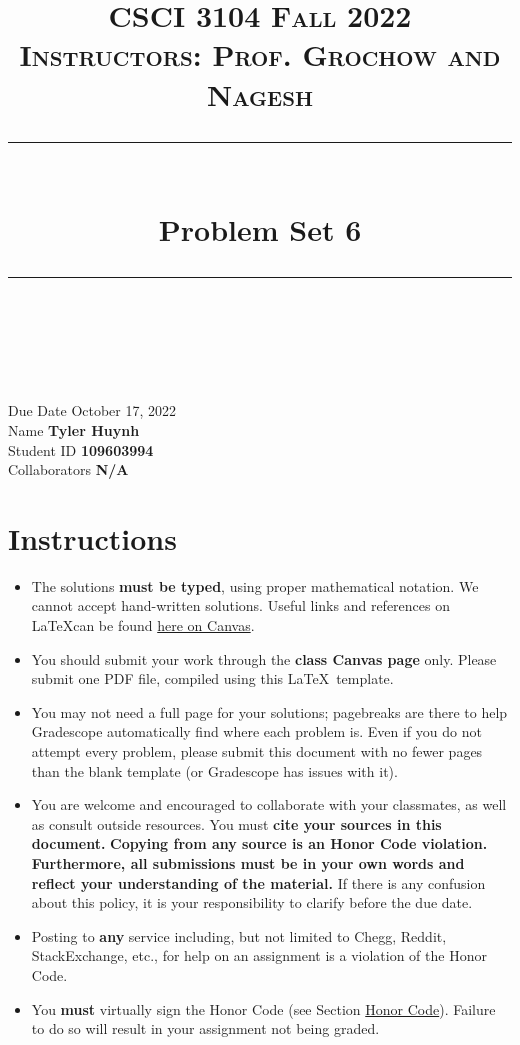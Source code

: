 \documentclass[11pt]{article}
\title{
\normalfont \normalsize 
\textsc{CSCI 3104 Fall 2022 \\ 
Instructors: Prof. Grochow and Nagesh} \\
[10pt] 
\rule{\linewidth}{0.5pt} \\[6pt] 
\huge Problem Set 6 \\
\rule{\linewidth}{2pt}  \\[10pt]
}
\date{}
\theoremstyle{definition}
\theoremstyle{definition}
\theoremstyle{definition}
\begin{document}

\maketitle


\noindent
Due Date \dotfill October 17, 2022 \\
Name \dotfill \textbf{Tyler Huynh} \\
Student ID \dotfill \textbf{109603994} \\
Collaborators \dotfill \textbf{N/A}

\renewcommand{\thesubsection}{\arabic{section}(\alph{subsection}). }

\tableofcontents

\section*{Instructions}
 \begin{itemize}
	\item The solutions \textbf{must be typed}, using proper mathematical notation. We cannot accept hand-written solutions. Useful links and references on \LaTeX can be found \href{https://canvas.colorado.edu/courses/75824/pages/latex}{here on Canvas}.
	\item You should submit your work through the \textbf{class Canvas page} only. Please submit one PDF file, compiled using this \LaTeX \ template.
	\item You may not need a full page for your solutions; pagebreaks are there to help Gradescope automatically find where each problem is. Even if you do not attempt every problem, please submit this document with no fewer pages than the blank template (or Gradescope has issues with it).

	\item You are welcome and encouraged to collaborate with your classmates, as well as consult outside resources. You must \textbf{cite your sources in this document.} \textbf{Copying from any source is an Honor Code violation. Furthermore, all submissions must be in your own words and reflect your understanding of the material.} If there is any confusion about this policy, it is your responsibility to clarify before the due date. 

	\item Posting to \textbf{any} service including, but not limited to Chegg, Reddit, StackExchange, etc., for help on an assignment is a violation of the Honor Code.

	\item You \textbf{must} virtually sign the Honor Code (see Section \hyperlink{HonorCode}{Honor Code}). Failure to do so will result in your assignment not being graded.
\end{itemize}
\end{document}
